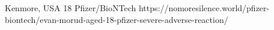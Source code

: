           {Kenmore, USA}
          {18}
          {Pfizer/BioNTech}
          {}
          {
          }
          {https://nomoresilence.world/pfizer-biontech/evan-morud-aged-18-pfizer-severe-adverse-reaction/}
